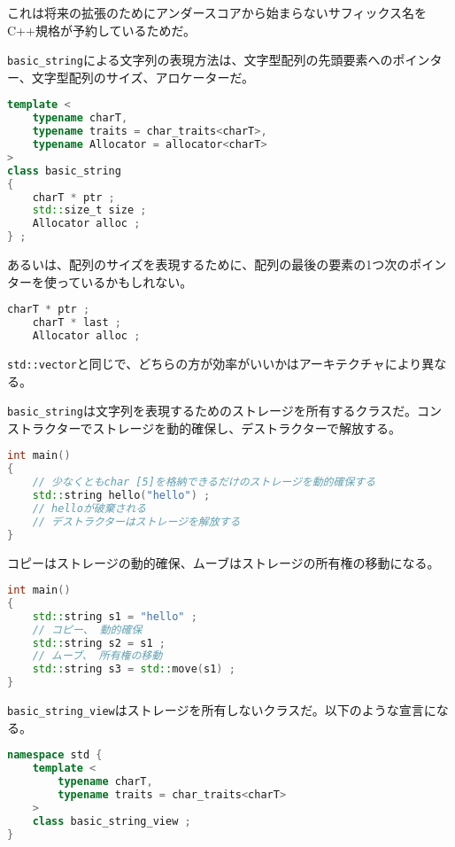 これは将来の拡張のためにアンダースコアから始まらないサフィックス名をC++規格が予約しているためだ。

\texttt{basic\_string}による文字列の表現方法は、文字型配列の先頭要素へのポインター、文字型配列のサイズ、アロケーターだ。

\begin{lstlisting}[language={C++}]
template <
    typename charT,
    typename traits = char_traits<charT>,
    typename Allocator = allocator<charT>
>
class basic_string
{
    charT * ptr ;
    std::size_t size ;
    Allocator alloc ;
} ;
\end{lstlisting}

あるいは、配列のサイズを表現するために、配列の最後の要素の1つ次のポインターを使っているかもしれない。

\begin{lstlisting}[language={C++}]
    charT * ptr ;
    charT * last ;
    Allocator alloc ;
\end{lstlisting}

\texttt{std::vector}と同じで、どちらの方が効率がいいかはアーキテクチャにより異なる。

\texttt{basic\_string}は文字列を表現するためのストレージを所有するクラスだ。コンストラクターでストレージを動的確保し、デストラクターで解放する。

\begin{lstlisting}[language={C++}]
int main()
{
    // 少なくともchar [5]を格納できるだけのストレージを動的確保する
    std::string hello("hello") ;
    // helloが破棄される
    // デストラクターはストレージを解放する
}
\end{lstlisting}

コピーはストレージの動的確保、ムーブはストレージの所有権の移動になる。

\ifTombow\pagebreak\fi
\begin{lstlisting}[language={C++}]
int main()
{
    std::string s1 = "hello" ;
    // コピー、 動的確保
    std::string s2 = s1 ;
    // ムーブ、 所有権の移動
    std::string s3 = std::move(s1) ;
}
\end{lstlisting}


\texttt{basic\_string\_view}はストレージを所有しないクラスだ。以下のような宣言になる。

\begin{lstlisting}[language={C++}]
namespace std {
    template <
        typename charT,
        typename traits = char_traits<charT>
    >
    class basic_string_view ;
}
\end{lstlisting}

